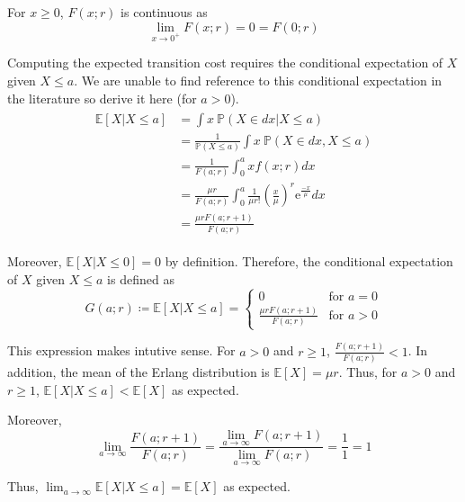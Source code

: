 For $x \geq 0$, $F (x; r)$ is continuous as
\begin{equation}
	\lim_{x \to 0^{+}} F (x; r) = 0 = F (0; r)
\end{equation}

Computing the expected transition cost requires the conditional expectation of $X$ given $X \leq a$. We are unable to find reference to this conditional expectation in the literature so derive it here (for $a > 0$).
\begin{align}
	\begin{split}
		\mathbb{E} [X | X \leq a]
		& = \int x \ \mathbb{P} (X \in d x | X \leq a) \\
		& = \frac{1}{\mathbb{P} (X \leq a)} \int x \ \mathbb{P} (X \in d x, X \leq a) \\
		& = \frac{1}{F (a; r)} \int_{0}^{a} x f(x; r) d x \\
		& = \frac{\mu r}{F (a; r)} \int_{0}^{a} \frac{1}{\mu r!} \left( \frac{x}{\mu} \right)^{r} \mathrm{e}^{\frac{-x}{\mu}} d x \\
		& = \frac{\mu r F (a; r + 1)}{F (a; r)}
	\end{split}
\end{align}

Moreover, $\mathbb{E} [X | X \leq 0] = 0$ by definition. Therefore, the conditional expectation of $X$ given $X \leq a$ is defined as
\begin{equation}
	G (a; r) \coloneqq \mathbb{E} [X | X \leq a] = \begin{cases} 0 & \text{for $a = 0$} \\ \frac{\mu r F (a; r + 1)}{F (a; r)} & \text{for $a > 0$} \end{cases}
\end{equation}

This expression makes intutive sense. For $a > 0$ and $r \geq 1$, $\frac{F (a; r + 1)}{F (a; r)} < 1$. In addition, the mean of the Erlang distribution is $\mathbb{E} [X] = \mu r$. Thus, for $a > 0$ and $r \geq 1$, $\mathbb{E} [X | X \leq a] < \mathbb{E} [X]$ as expected.

Moreover, 
\begin{equation}
	\lim_{a \to \infty} \frac{F (a; r + 1)}{F (a; r)} = \frac{\displaystyle \lim_{a \to \infty} F (a; r + 1)}{\displaystyle \lim_{a \to \infty} F (a; r)} = \frac{1}{1} = 1
\end{equation}

Thus, $\displaystyle \lim_{a \to \infty} \mathbb{E} [X | X \leq a] = \mathbb{E} [X]$ as expected.

